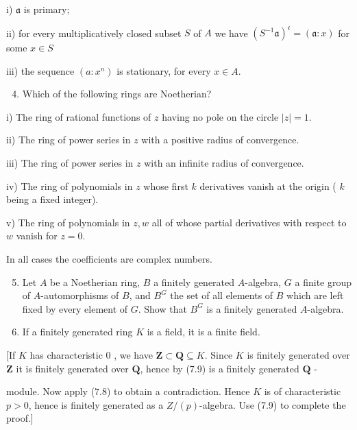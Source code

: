 \documentclass{standalone}
\theoremstyle{definition}
\theoremstyle{remark}
\begin{document}
i) $\mathfrak{a}$ is primary;

ii) for every multiplicatively closed subset $S$ of $A$ we have $\left(S^{-1} \mathfrak{a}\right)^{\mathfrak{c}}=(\mathfrak{a}: x)$ for some $x \in S$

iii) the sequence $\left(a: x^{n}\right)$ is stationary, for every $x \in A$.

\begin{enumerate}
  \setcounter{enumi}{3}
  \item Which of the following rings are Noetherian?
\end{enumerate}

i) The ring of rational functions of $z$ having no pole on the circle $|z|=1$.

ii) The ring of power series in $z$ with a positive radius of convergence.

iii) The ring of power series in $z$ with an infinite radius of convergence.

iv) The ring of polynomials in $z$ whose first $k$ derivatives vanish at the origin ( $k$ being a fixed integer).

v) The ring of polynomials in $z, w$ all of whose partial derivatives with respect to $w$ vanish for $z=0$.

In all cases the coefficients are complex numbers.

\begin{enumerate}
  \setcounter{enumi}{4}
  \item Let $A$ be a Noetherian ring, $B$ a finitely generated $A$-algebra, $G$ a finite group of $A$-automorphisms of $B$, and $B^{G}$ the set of all elements of $B$ which are left fixed by every element of $G$. Show that $B^{G}$ is a finitely generated $A$-algebra.

  \item If a finitely generated ring $K$ is a field, it is a finite field.

\end{enumerate}

[If $K$ has characteristic 0 , we have $\mathbf{Z} \subset \mathbf{Q} \subseteq K$. Since $K$ is finitely generated over $\mathbf{Z}$ it is finitely generated over $\mathbf{Q}$, hence by (7.9) is a finitely generated $\mathbf{Q}$ -

\begin{center}
\end{center}

module. Now apply (7.8) to obtain a contradiction. Hence $K$ is of characteristic $p>0$, hence is finitely generated as a $Z /(p)$-algebra. Use (7.9) to complete the proof.]
\end{document}
